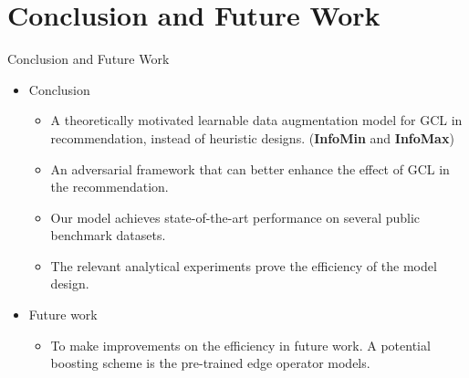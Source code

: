 \documentclass[t]{beamer}
\begin{document}
\section{Conclusion and Future Work}
\label{sec:conclusion}
\begin{frame}{Conclusion and Future Work}

\begin{itemize}
    \item Conclusion
    \begin{itemize}
        \item A theoretically motivated learnable data augmentation model for GCL in recommendation, instead of  heuristic designs. (\textbf{InfoMin} and \textbf{InfoMax})
        \item An adversarial framework that can better enhance the effect of GCL in the recommendation.
        \item Our model achieves state-of-the-art performance on several public benchmark datasets.
        \item The relevant analytical experiments prove the efficiency of the model design.
    \end{itemize}
    \item Future work
    \begin{itemize}
        \item To make improvements on the efficiency in future work.
A potential boosting scheme is the pre-trained edge operator models.
    \end{itemize}
\end{itemize}
\end{frame}


\qapage

\end{document}
